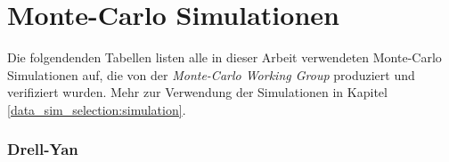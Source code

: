 


\chapter{Monte-Carlo Simulationen}
\label{appendix:monte_carlo_samples}
Die folgendenden Tabellen listen alle in dieser Arbeit verwendeten Monte-Carlo
Simulationen auf, die von der \textit{Monte-Carlo Working Group} produziert und
verifiziert wurden. Mehr zur Verwendung der Simulationen in Kapitel
\ref{data_sim_selection:simulation}.

\subsection*{Drell-Yan}
